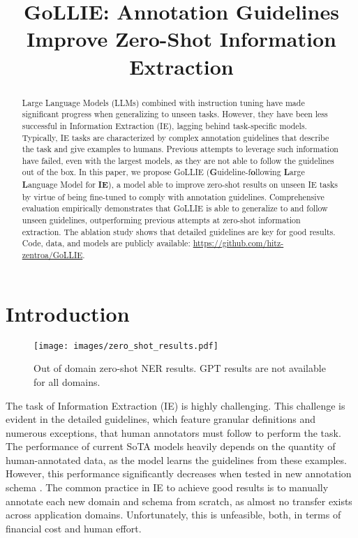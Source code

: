 \title{GoLLIE: Annotation Guidelines Improve Zero-Shot Information Extraction}



\maketitle

\begin{abstract}
Large Language Models (LLMs) combined with instruction tuning have made significant progress when generalizing to unseen tasks. However, they have been less successful in Information Extraction (IE), lagging behind task-specific models. Typically, IE tasks are characterized by complex annotation guidelines that describe the task and give examples to humans. 
Previous attempts to leverage such information have failed, even with the largest models, as they are not able to follow the guidelines out of the box. 
In this paper, we propose GoLLIE (\textbf{G}uideline-f\textbf{o}llowing \textbf{L}arge \textbf{L}anguage Model for \textbf{IE}), a model able to improve zero-shot results on unseen IE tasks by virtue of being fine-tuned to comply with annotation guidelines.
Comprehensive evaluation empirically demonstrates that GoLLIE is able to generalize to and follow unseen guidelines, outperforming previous attempts at zero-shot information extraction. The ablation study shows that detailed %
guidelines are key for good results. 
Code, data, and models are publicly available: \url{https://github.com/hitz-zentroa/GoLLIE}. %

\end{abstract}

\section{Introduction}
\begin{figure}[b]
    \centering
    \texttt{[image: images/zero\_shot\_results.pdf]}
    \caption{Out of domain zero-shot NER results. GPT results are not available for all domains.}
    \label{fig:zero-shot-results}
\end{figure}

The task of Information Extraction (IE) is highly challenging. This challenge is evident in the detailed guidelines, which feature granular definitions and numerous exceptions, that human annotators must follow to perform the task. The performance of current SoTA models heavily depends on the quantity of human-annotated data, as the model learns the guidelines from these examples. However, this performance significantly decreases when tested in new annotation schema \citep{DBLP:conf/aaai/Liu0YDJCMF21}. The common practice in IE to achieve good results is to manually annotate each new domain and schema from scratch, as almost no transfer exists across application domains. Unfortunately, this is unfeasible, both, in terms of financial cost and human effort.

